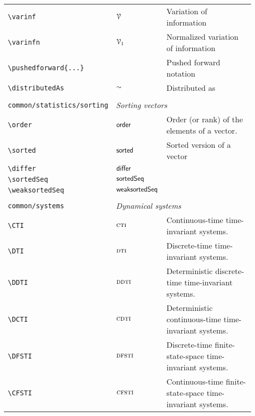 \begin{longtable}{lll}
 {\color[rgb]{0.5,0.5,0.5}\texttt{\textbackslash varinf}} & $\mathcal{V}$ &  Variation of information\\ 
 {\color[rgb]{0.5,0.5,0.5}\texttt{\textbackslash varinfn}} & $\mathcal{V}_{1}$ &  Normalized variation of information\\ 
 {\color[rgb]{0.5,0.5,0.5}\texttt{\textbackslash pushedforward\{...\}}} &  &  Pushed forward notation\\ 
 {\color[rgb]{0.5,0.5,0.5}\texttt{\textbackslash distributedAs}} & $\sim$ &  Distributed as\\ 
  &  & \\ 
 {\color[rgb]{0.5,0.5,0.5}\texttt{common/statistics/sorting}} & \multicolumn{2}{l}{\emph{Sorting vectors}}\\ 
 \hline
{\color[rgb]{0.5,0.5,0.5}\texttt{\textbackslash order}} & $\mathsf{order}$ &  Order (or rank) of the elements of a vector.\\ 
 {\color[rgb]{0.5,0.5,0.5}\texttt{\textbackslash sorted}} & $\mathsf{sorted}$ &  Sorted version of a vector\\ 
 {\color[rgb]{0.5,0.5,0.5}\texttt{\textbackslash differ}} & $\mathsf{differ}$ & \\ 
 {\color[rgb]{0.5,0.5,0.5}\texttt{\textbackslash sortedSeq}} & $\mathsf{sortedSeq}$ & \\ 
 {\color[rgb]{0.5,0.5,0.5}\texttt{\textbackslash weaksortedSeq}} & $\mathsf{weaksortedSeq}$ & \\ 
  &  & \\ 
 {\color[rgb]{0.5,0.5,0.5}\texttt{common/systems}} & \multicolumn{2}{l}{\emph{Dynamical systems}}\\ 
 \hline
{\color[rgb]{0.5,0.5,0.5}\texttt{\textbackslash CTI}} & $\textsc{cti}$ &  Continuous-time time-invariant systems.\\ 
 {\color[rgb]{0.5,0.5,0.5}\texttt{\textbackslash DTI}} & $\textsc{dti}$ &  Discrete-time time-invariant systems.\\ 
 {\color[rgb]{0.5,0.5,0.5}\texttt{\textbackslash DDTI}} & $\textsc{ddti}$ &  Deterministic discrete-time time-invariant systems.\\ 
 {\color[rgb]{0.5,0.5,0.5}\texttt{\textbackslash DCTI}} & $\textsc{cdti}$ &  Deterministic continuous-time time-invariant systems.\\ 
 {\color[rgb]{0.5,0.5,0.5}\texttt{\textbackslash DFSTI}} & $\textsc{dfsti}$ &  Discrete-time finite-state-space time-invariant systems.\\ 
 {\color[rgb]{0.5,0.5,0.5}\texttt{\textbackslash CFSTI}} & $\textsc{cfsti}$ &  Continuous-time finite-state-space time-invariant systems.\\ 

\end{longtable}
